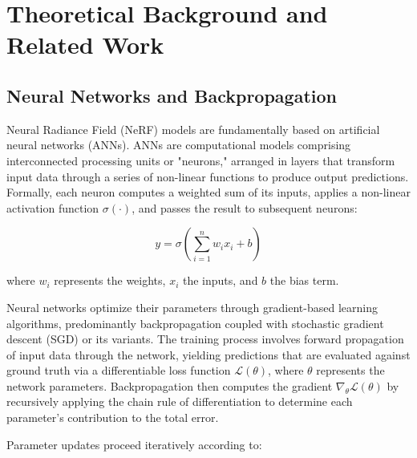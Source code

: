 
\chapter{Theoretical Background and Related Work}\label{chapter:background}


\section{Neural Networks and Backpropagation}

Neural Radiance Field (NeRF) models are fundamentally based on artificial neural networks (ANNs). ANNs are computational models comprising interconnected processing units or "neurons," arranged in layers that transform input data through a series of non-linear functions to produce output predictions\parencite{Han2018Artificial}. Formally, each neuron computes a weighted sum of its inputs, applies a non-linear activation function $\sigma(\cdot)$, and passes the result to subsequent neurons:

\begin{equation}
y = \sigma\left(\sum_{i=1}^{n} w_i x_i + b\right)
\end{equation}

\noindent where $w_i$ represents the weights, $x_i$ the inputs, and $b$ the bias term.

Neural networks optimize their parameters through gradient-based learning algorithms, predominantly backpropagation coupled with stochastic gradient descent (SGD) or its variants. The training process involves forward propagation of input data through the network, yielding predictions that are evaluated against ground truth via a differentiable loss function $\mathcal{L}(\theta)$, where $\theta$ represents the network parameters. Backpropagation then computes the gradient $\nabla_\theta \mathcal{L}(\theta)$ by recursively applying the chain rule of differentiation to determine each parameter's contribution to the total error.

Parameter updates proceed iteratively according to:


